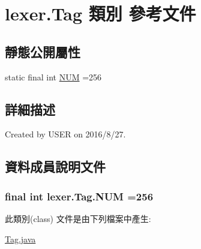 \hypertarget{classlexer_1_1_tag}{}\section{lexer.\+Tag 類別 參考文件}
\label{classlexer_1_1_tag}
\subsection*{靜態公開屬性}
\begin{DoxyCompactItemize}
\item 
static final int \hyperlink{classlexer_1_1_tag_aafbd77c472e395e2fd5cce9f772bca75}{N\+UM} =256
\end{DoxyCompactItemize}


\subsection{詳細描述}
Created by U\+S\+ER on 2016/8/27. 

\subsection{資料成員說明文件}
\subsubsection[{\texorpdfstring{N\+UM}{NUM}}]{\setlength{\rightskip}{0pt plus 5cm}final int lexer.\+Tag.\+N\+UM =256\hspace{0.3cm}{\ttfamily [static]}}\hypertarget{classlexer_1_1_tag_aafbd77c472e395e2fd5cce9f772bca75}{}\label{classlexer_1_1_tag_aafbd77c472e395e2fd5cce9f772bca75}


此類別(class) 文件是由下列檔案中產生\+:\begin{DoxyCompactItemize}
\item 
\hyperlink{_tag_8java}{Tag.\+java}\end{DoxyCompactItemize}

